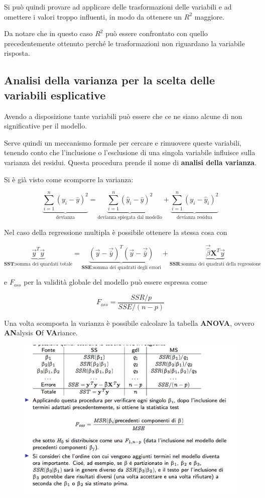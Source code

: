 Si può quindi provare ad applicare delle trasformazioni delle variabili e ad omettere i valori troppo influenti, in modo da ottenere un $ R^2 $ maggiore.

Da notare che in questo caso $ R^2 $ può essere confrontato con quello precedentemente ottenuto perché le trasformazioni non riguardano la variabile risposta.

\subsection{Analisi della varianza per la scelta delle variabili esplicative}

Avendo a disposizione tante variabili può essere che ce ne siano alcune di non significative per il modello.

Serve quindi un meccanismo formale per cercare e rimuovere queste variabili, tenendo conto che l'inclusione o l'esclusione di una singola variabile influisce sulla varianza dei residui. Questa procedura prende il nome di \textbf{analisi della varianza}.

Si è già visto come scomporre la varianza:

$$
\underbrace{\sum\limits_{i=1}^n (y_i - \bar{y})^2}_{\text{devianza}} = \underbrace{\sum\limits_{i=1}^n (\hat{y}_i - \bar{y})^2}_{\text{devianza spiegata dal modello}} + \underbrace{\sum\limits_{i=1}^n (y_i - \hat{y}_i)^2}_{\text{devianza residua}}  
$$

Nel caso della regressione multipla è possibile ottenere la stessa cosa con

$$
\underbrace{\vec{y}^T\vec{y}}_{\textbf{SST}: \text{somma dei quardati totale}} = 
\underbrace{(\vec{y} - \vec{\bar{y}})^T (\vec{y} - \vec{\bar{y}})}_{\textbf{SSE}: \text{somma dei quadrati degli errori}} +
\underbrace{\vec{\hat{\beta}} \textbf{X}^T\vec{y}}_{\textbf{SSR}: \text{somma dei quadrati della regressione}}
$$

e $F_{oss} $ per la validità globale del modello può essere espressa come

$$
F_{oss} = \frac{SSR/p}{SSE/(n-p)}
$$

Una volta scomposta la varianza è possibile calcolare la tabella \textbf{ANOVA}, ovvero \textbf{AN}alysis \textbf{O}f \textbf{VA}riance.


\begin{figure}[htbp]
	\centering
	\includegraphics[width=.7\textwidth]{./notes/immagini/l10-fig3.png}
\end{figure}

